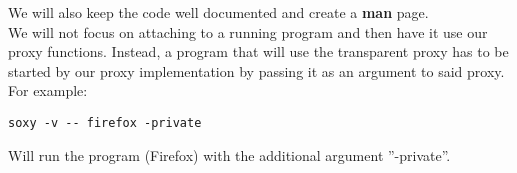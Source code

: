 \documentclass[a4paper]{article}
\begin{document}
We will also keep the code well documented and create a \textbf{man} page. \\

We will not focus on attaching to a running program and then have it use our
proxy functions. %
Instead, a program that will use the transparent proxy has to be started by our
proxy implementation by passing it as an argument to said proxy. For example:

\begin{verbatim}
soxy -v -- firefox -private
\end{verbatim}

Will run the program (Firefox) with the additional argument ''-private''.
\end{document}
